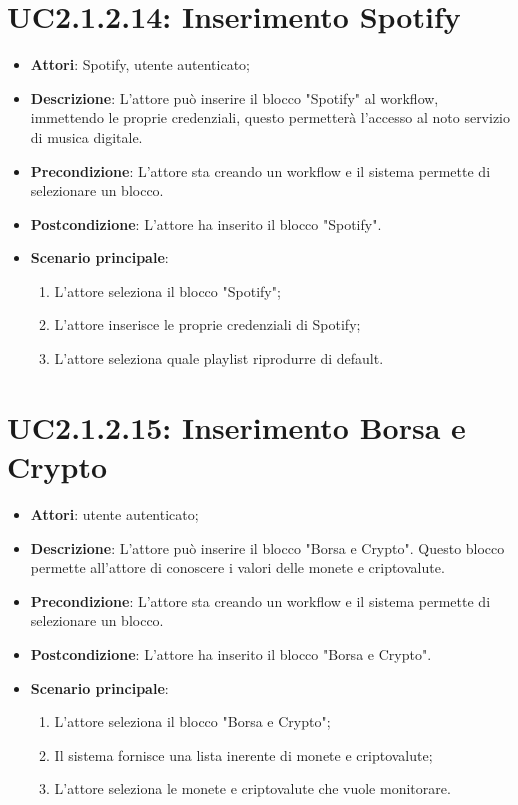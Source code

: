 \section{UC2.1.2.14: Inserimento Spotify}
\label{UC2.1.2.14}
\begin{itemize}
	\item \textbf{Attori}: Spotify, utente autenticato;
	\item \textbf{Descrizione}: L'attore può inserire il blocco "Spotify" al workflow, immettendo le proprie credenziali, questo permetterà l'accesso al noto servizio di musica digitale.
	\item \textbf{Precondizione}: L'attore sta creando un workflow e il sistema permette di selezionare un blocco.
	\item \textbf{Postcondizione}: L'attore ha inserito il blocco "Spotify".
	\item \textbf{Scenario principale}:
	\begin{enumerate} \item L'attore seleziona il blocco "Spotify";  \item  L'attore inserisce le proprie credenziali di Spotify;  \item  L'attore seleziona quale playlist riprodurre di default.\end{enumerate}
\end{itemize}

\section{UC2.1.2.15: Inserimento Borsa e Crypto}
\label{UC2.1.2.15}
\begin{itemize}
	\item \textbf{Attori}: utente autenticato;
	\item \textbf{Descrizione}: L'attore può inserire il blocco "Borsa e Crypto". Questo blocco permette all'attore di conoscere i valori delle monete e criptovalute. 
	\item \textbf{Precondizione}: L'attore sta creando un workflow e il sistema permette di selezionare un blocco.
	\item \textbf{Postcondizione}: L'attore ha inserito il blocco "Borsa e Crypto".
	\item \textbf{Scenario principale}:
	\begin{enumerate} \item L'attore seleziona il blocco "Borsa e Crypto";  \item  Il sistema fornisce una lista inerente di monete e criptovalute;  \item  L'attore seleziona le monete e criptovalute che vuole monitorare.\end{enumerate}
\end{itemize}


